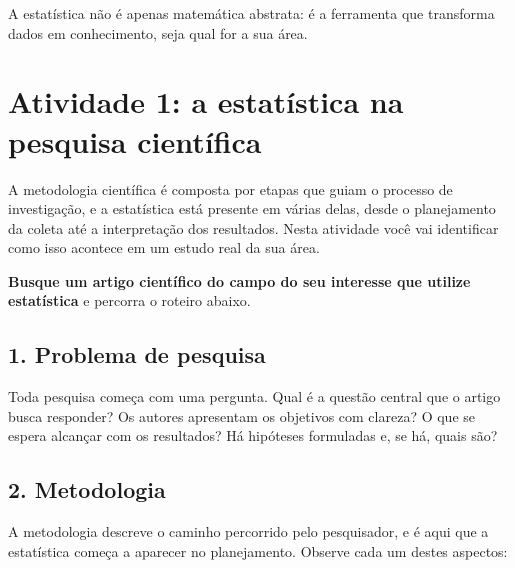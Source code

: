 \documentclass[
]{book}
\begin{document}
A estatística não é apenas matemática abstrata: é a ferramenta que transforma dados em conhecimento, seja qual for a sua área.

\section{Atividade 1: a estatística na pesquisa científica}\label{atividade-1-a-estatuxedstica-na-pesquisa-cientuxedfica}

A metodologia científica é composta por etapas que guiam o processo de investigação, e a estatística está presente em várias delas, desde o planejamento da coleta até a interpretação dos resultados. Nesta atividade você vai identificar como isso acontece em um estudo real da sua área.

\textbf{Busque um artigo científico do campo do seu interesse que utilize estatística} e percorra o roteiro abaixo.

\subsection{1. Problema de pesquisa}\label{problema-de-pesquisa}

Toda pesquisa começa com uma pergunta. Qual é a questão central que o artigo busca responder? Os autores apresentam os objetivos com clareza? O que se espera alcançar com os resultados? Há hipóteses formuladas e, se há, quais são?

\subsection{2. Metodologia}\label{metodologia}

A metodologia descreve o caminho percorrido pelo pesquisador, e é aqui que a estatística começa a aparecer no planejamento. Observe cada um destes aspectos:
\end{document}
